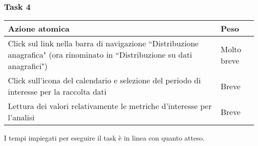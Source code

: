 \subsubsection{Task 4}
\label{sss:iaa-task-4}

{
\renewcommand{\arraystretch}{2}
\begin{longtable}[h]{| p{14cm} | p{2.5cm} |}
    \hline
    \textbf{Azione atomica} & \textbf{Peso} \\
    \hline
    \endhead
    Click sul link nella barra di navigazione ``Distribuzione anagrafica" (ora rinominato in ``Distribuzione su dati anagrafici") & Molto breve \\
    \hline
    Click sull'icona del calendario e selezione del periodo di interesse per la raccolta dati & Breve \\
    \hline
    Lettura dei valori relativamente le metriche d'interesse per l'analisi & Breve \\
    \hline
\end{longtable}
}
I tempi impiegati per eseguire il task è in linea con quanto atteso.